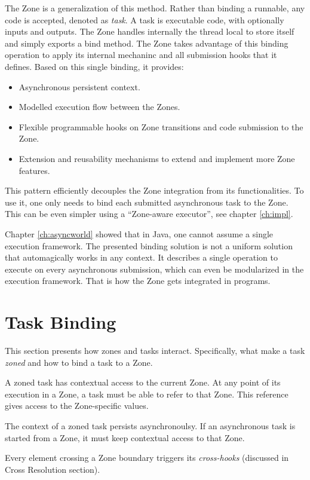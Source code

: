 The Zone is a generalization of this method. Rather than binding a runnable, any code is accepted, denoted as \emph{task}. A task is executable code, with optionally inputs and outputs. The Zone handles internally the thread local to store itself and simply exports a bind method.
The Zone takes advantage of this binding operation to apply its internal mechaninc and all submission hooks that it defines. Based on this single binding, it provides:
\begin{itemize}
\item Asynchronous persistent context.
\item Modelled execution flow between the Zones.
\item Flexible programmable hooks on Zone transitions and code submission to the Zone.
\item Extension and reusability mechanisms to extend and implement more Zone features.
\end{itemize}


This pattern efficiently decouples the Zone integration from its functionalities. To use it, one only needs to bind each submitted asynchronous task to the Zone. This can be even simpler using a ``Zone-aware executor'', see chapter \ref{ch:impl}.

Chapter \ref{ch:asyncworld} showed that in Java, one cannot assume a single execution framework. The presented binding solution is not a uniform solution that automagically works in any context. It describes a single operation to execute on every asynchronous submission, which can even be modularized in the execution framework. That is how the Zone gets integrated in programs.

\section{Task Binding}

This section presents how zones and tasks interact. Specifically, what make a task \emph{zoned} and how to bind a task to a Zone.

A zoned task has contextual access to the current Zone. At any point of its execution in a Zone, a task must be able to refer to that Zone. This reference gives
access to the Zone-specific values.

The context of a zoned task persists asynchronoulsy. If an asynchronous task is started from a Zone, it must keep contextual access to that Zone.

Every element crossing a Zone boundary triggers its \emph{cross-hooks} (discussed in Cross Resolution section).

